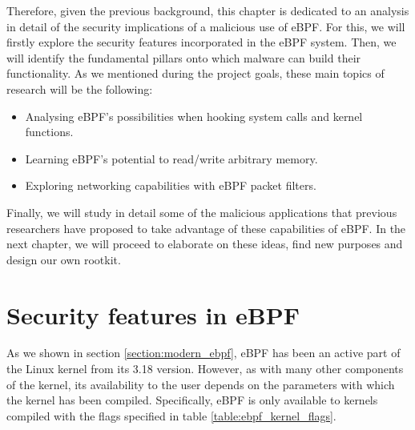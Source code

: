 \documentclass[12pt]{report} %
\begin{document}
Therefore, given the previous background, this chapter is dedicated to an analysis in detail of the security implications of a malicious use of eBPF. For this, we will firstly explore the security features incorporated in the eBPF system. Then, we will identify the fundamental pillars onto which malware can build their functionality. As we mentioned during the project goals, these main topics of research will be the following:
\begin{itemize}
\item Analysing eBPF's possibilities when hooking system calls and kernel functions.
\item Learning eBPF's potential to read/write arbitrary memory.
\item Exploring networking capabilities with eBPF packet filters.
\end{itemize}


Finally, we will study in detail some of the malicious applications that previous researchers have proposed to take advantage of these capabilities of eBPF. In the next chapter, we will proceed to elaborate on these ideas, find new purposes and design our own rootkit.

\section{Security features in eBPF}
As we shown in section \ref{section:modern_ebpf}, eBPF has been an active part of the Linux kernel from its 3.18 version. However, as with many other components of the kernel, its availability to the user depends on the parameters with which the kernel has been compiled. Specifically, eBPF is only available to kernels compiled with the flags specified in table \ref{table:ebpf_kernel_flags}.
\end{document}
